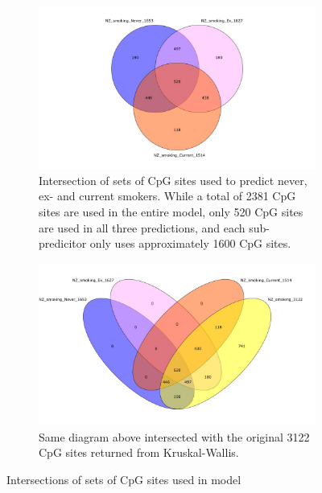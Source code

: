 \documentclass{article}
\begin{document}
\begin{figure}[H]
    \centering
    \begin{subfigure}{\textwidth}
        \centering
        \includegraphics[width=\linewidth]{Venn_NZ_3gps.jpg}
        \caption{Intersection of sets of CpG sites used to predict never, ex- and current smokers. While a total of 2381 CpG sites are used in the entire model, only 520 CpG sites are used in all three predictions, and each sub-predicitor only uses approximately 1600 CpG sites.}
    \end{subfigure}
    \begin{subfigure}{\textwidth}
        \centering
        \includegraphics[width=\linewidth]{Venn_NZ_3gps_KWlist.jpg}
        \caption{Same diagram above intersected with the original 3122 CpG sites returned from Kruskal-Wallis.}
    \end{subfigure}
    \caption{Intersections of sets of CpG sites used in model}
    \label{fig:model-intersect}
\end{figure}
\end{document}
